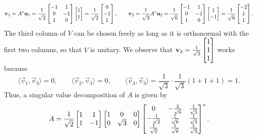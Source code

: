 \documentclass{homework}
\begin{document}
\begin{alphaparts}
\begin{equation*}
			\mathbf{v}_1 = A^*\mathbf{u}_1 = \frac{1}{\sqrt{2}}\left[\begin{matrix}-1 & 1 \\ 0 & -1 \\ 1 & 0\end{matrix}\right]\left[\begin{matrix}1 \\1\end{matrix}\right] = \frac{1}{\sqrt{2}}\left[\begin{matrix}0 \\-1\\1\end{matrix}\right],\qquad \mathbf{v}_2 = \frac{1}{\sqrt{3}}A^*\mathbf{u}_2 = \frac{1}{\sqrt{6}}\left[\begin{matrix}-1 & 1 \\ 0 & -1 \\ 1 & 0\end{matrix}\right]\left[\begin{matrix}1\\-1\end{matrix}\right] = \frac{1}{\sqrt{6}}\left[\begin{matrix}-2\\1\\1\end{matrix}\right].
		\end{equation*}
		The third column of $V$ can be chosen freely as long as it is orthonormal with the first two columns, so that $V$ is unitary. We observe that $\mathbf{v}_3 = \frac{1}{\sqrt{3}}\left[\begin{matrix}1\\1\\1\end{matrix}\right]$ works because
		\begin{equation*}
			\langle\vec{v}_1,\vec{v}_3\rangle = 0, \qquad \langle\vec{v}_2,\vec{v}_3\rangle = 0, \qquad \langle\vec{v}_3, \vec{v}_3\rangle = \frac{1}{\sqrt{3}}\cdot\frac{1}{\sqrt{3}}(1+1+1) = 1.
		\end{equation*}
		Thus, a singular value decomposition of $A$ is given by
		\begin{equation*}
			A = \frac{1}{\sqrt{2}}\left[\begin{matrix}1 &1\\1&-1\end{matrix}\right]\left[\begin{matrix}1 &0 & 0\\0&\sqrt{3}& 0\end{matrix}\right]\left[\begin{matrix}0 & -\frac{2}{\sqrt{6}} & \frac{1}{\sqrt{3}}\\ -\frac{1}{\sqrt{2}} & \frac{1}{\sqrt{6}} & \frac{1}{\sqrt{3}}\\ \frac{1}{\sqrt{2}} & \frac{1}{\sqrt{6}} & \frac{1}{\sqrt{3}}\end{matrix}\right]^*.
		\end{equation*}
		

\end{alphaparts}
\end{document}
